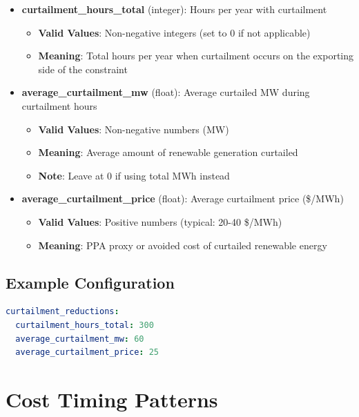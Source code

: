 \documentclass[ctcc_full_documentation.tex]{subfiles}
\begin{document}
\begin{itemize}
    \item \textbf{curtailment\_hours\_total} (integer): Hours per year with curtailment
    \begin{itemize}
        \item \textbf{Valid Values}: Non-negative integers (set to 0 if not applicable)
        \item \textbf{Meaning}: Total hours per year when curtailment occurs on the exporting side of the constraint
    \end{itemize}
    
    \item \textbf{average\_curtailment\_mw} (float): Average curtailed MW during curtailment hours
    \begin{itemize}
        \item \textbf{Valid Values}: Non-negative numbers (MW)
        \item \textbf{Meaning}: Average amount of renewable generation curtailed
        \item \textbf{Note}: Leave at 0 if using total MWh instead
    \end{itemize}
    
    \item \textbf{average\_curtailment\_price} (float): Average curtailment price (\$/MWh)
    \begin{itemize}
        \item \textbf{Valid Values}: Positive numbers (typical: 20-40 \$/MWh)
        \item \textbf{Meaning}: PPA proxy or avoided cost of curtailed renewable energy
    \end{itemize}
    
\end{itemize}

\subsection{Example Configuration}

\begin{lstlisting}[language=yaml]
curtailment_reductions:
  curtailment_hours_total: 300
  average_curtailment_mw: 60
  average_curtailment_price: 25
\end{lstlisting}

\section{Cost Timing Patterns}
\label{sec:timing}
\end{document}
